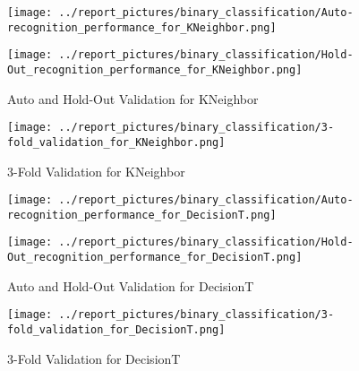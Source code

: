         \begin{figure}[H]
            \begin{minipage}[c]{.46\linewidth}
                  \texttt{[image: ../report\_pictures/binary\_classification/Auto-recognition\_performance\_for\_KNeighbor.png]}
            \end{minipage} \hfill
            \begin{minipage}[c]{.46\linewidth}
                \texttt{[image: ../report\_pictures/binary\_classification/Hold-Out\_recognition\_performance\_for\_KNeighbor.png]}
            \end{minipage}
            \caption{Auto and Hold-Out Validation for KNeighbor}
            \label{CV_KNeighbor}
        \end{figure}   
   
        \begin{figure}[H]
            \texttt{[image: ../report\_pictures/binary\_classification/3-fold\_validation\_for\_KNeighbor.png]}
        \caption{3-Fold Validation for KNeighbor}
        \label{3Fold_KNeighbor}
        \end{figure} 
        
        \begin{figure}[H]
            \begin{minipage}[c]{.46\linewidth}
                  \texttt{[image: ../report\_pictures/binary\_classification/Auto-recognition\_performance\_for\_DecisionT.png]}
            \end{minipage} \hfill
            \begin{minipage}[c]{.46\linewidth}
                \texttt{[image: ../report\_pictures/binary\_classification/Hold-Out\_recognition\_performance\_for\_DecisionT.png]}
            \end{minipage}
            \caption{Auto and Hold-Out Validation for DecisionT}
            \label{CV_DecisionT}
        \end{figure}   
   
        \begin{figure}[H]
            \texttt{[image: ../report\_pictures/binary\_classification/3-fold\_validation\_for\_DecisionT.png]}
        \caption{3-Fold Validation for DecisionT}
        \label{3Fold_DecisionT}
        \end{figure} 
        
